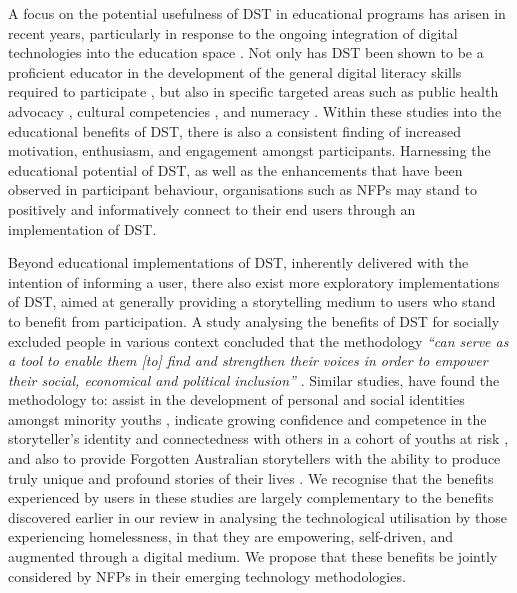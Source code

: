 A focus on the potential usefulness of DST in educational programs has arisen in recent years, particularly in response to the ongoing integration of digital technologies into the education space \cite{stanley2018digital}. Not only has DST been shown to be a proficient educator in the development of the general digital literacy skills required to participate \cite{niemi2016digital}, but also in specific targeted areas such as public health advocacy \cite{de2018using}, cultural competencies \cite{grant2016digital}, and numeracy \cite{niemi2018digital}. Within these studies into the educational benefits of DST, there is also a consistent finding of increased motivation, enthusiasm, and engagement amongst participants. Harnessing the educational potential of DST, as well as the enhancements that have been observed in participant behaviour, organisations such as NFPs may stand to positively and informatively connect to their end users through an implementation of DST.

Beyond educational implementations of DST, inherently delivered with the intention of informing a user, there also exist more exploratory implementations of DST, aimed at generally providing a storytelling medium to users who stand to benefit from participation. A study analysing the benefits of DST for socially excluded people in various context concluded that the methodology \emph{“can serve as a tool to enable them [to] find and strengthen their voices in order to empower their social, economical and political inclusion”} \cite[p.~224]{moutafidou2018digital}. Similar studies, have found the methodology to: assist in the development of personal and social identities amongst minority youths \cite{anderson2019digital}, indicate growing confidence and competence in the storyteller's identity and connectedness with others in a cohort of youths at risk \cite{podkalicka2010understanding}, and also to provide Forgotten Australian storytellers with the ability to produce truly unique and profound stories of their lives \cite{hancox2012process}. We recognise that the benefits experienced by users in these studies are largely complementary to the benefits discovered earlier in our review in analysing the technological utilisation by those experiencing homelessness, in that they are empowering, self-driven, and augmented through a digital medium. We propose that these benefits be jointly considered by NFPs in their emerging technology methodologies. 

